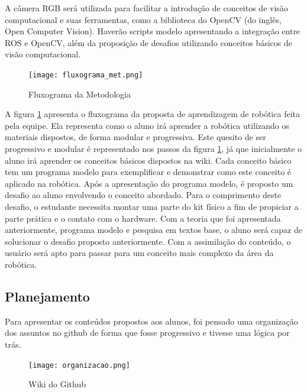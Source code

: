 A câmera RGB será utilizada para facilitar a introdução de conceitos de visão computacional e suas ferramentas, como a biblioteca do OpenCV (do inglês, Open Computer Vision). Haverão scripts modelo apresentando a integração entre ROS e OpenCV, além da proposição de desafios utilizando conceitos básicos de visão computacional.

\begin{figure}[h!]                                                
	\centering        
	\texttt{[image: fluxograma\_met.png]}            
	\caption{Fluxograma da Metodologia}        
	\label{img:flu_metod}    
\end{figure}

A figura \ref{img:flu_metod} apresenta o fluxograma da proposta de aprendizagem de robótica feita pela equipe. Ela representa como o aluno irá aprender a robótica utilizando os materiais dispostos, de forma modular e progressiva. 
Este quesito de ser progressivo e modular é representado nos passos da figura \ref{img:flu_metod}, já que inicialmente o aluno irá aprender os conceitos básicos dispostos na wiki. Cada conceito básico tem um programa modelo para exemplificar e demonstrar como este conceito é aplicado na robótica. Após a apresentação do programa modelo, é proposto um desafio ao aluno envolvendo o conceito abordado. Para o comprimento deste desafio, o estudante necessita montar uma parte do kit físico a fim de propiciar a parte prática e o contato com o hardware. Com a teoria que foi apresentada anteriormente, programa modelo e pesquisa em textos base, o aluno será capaz de solucionar o desafio proposto anteriormente. Com a assimilação do conteúdo, o usuário será apto para passar para um conceito mais complexo da área da robótica.



\subsection{Planejamento}
Para apresentar os conteúdos propostos aos alunos, foi pensado uma organização dos assuntos no github de forma que fosse progressivo e tivesse uma lógica por trás. 

\begin{figure}[!h]                                                
	\centering        
	\texttt{[image: organizacao.png]}            
	\caption{Wiki do Github}        
	\label{img:org}    
\end{figure}

